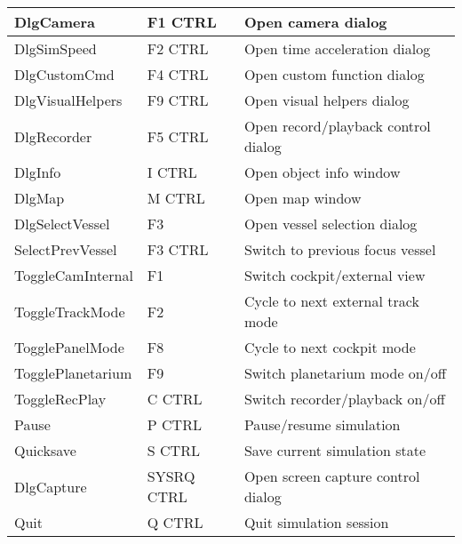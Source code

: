 \documentclass[Orbiter User Manual.tex]{subfiles}
\begin{document}
\begin{longtable}{ |p{}|p{}|p{}| }
	DlgCamera & F1 CTRL & Open camera dialog\\
	\hline\rule{0pt}{2ex}
	DlgSimSpeed & F2 CTRL & Open time acceleration dialog\\
	\hline\rule{0pt}{2ex}
	DlgCustomCmd & F4 CTRL & Open custom function dialog\\
	\hline\rule{0pt}{2ex}
	DlgVisualHelpers & F9 CTRL & Open visual helpers dialog\\
	\hline\rule{0pt}{2ex}
	DlgRecorder & F5 CTRL & Open record/playback control dialog\\
	\hline\rule{0pt}{2ex}
	DlgInfo & I CTRL & Open object info window\\
	\hline\rule{0pt}{2ex}
	DlgMap & M CTRL & Open map window\\
	\hline\rule{0pt}{2ex}
	DlgSelectVessel & F3 & Open vessel selection dialog\\
	\hline\rule{0pt}{2ex}
	SelectPrevVessel & F3 CTRL & Switch to previous focus vessel\\
	\hline\rule{0pt}{2ex}
	ToggleCamInternal & F1 & Switch cockpit/external view\\
	\hline\rule{0pt}{2ex}
	ToggleTrackMode & F2 & Cycle to next external track mode\\
	\hline\rule{0pt}{2ex}
	TogglePanelMode & F8 & Cycle to next cockpit mode\\
	\hline\rule{0pt}{2ex}
	TogglePlanetarium & F9 & Switch planetarium mode on/off\\
	\hline\rule{0pt}{2ex}
	ToggleRecPlay & C CTRL & Switch recorder/playback on/off\\
	\hline\rule{0pt}{2ex}
	Pause & P CTRL & Pause/resume simulation\\
	\hline\rule{0pt}{2ex}
	Quicksave & S CTRL & Save current simulation state\\
	\hline\rule{0pt}{2ex}
	DlgCapture & SYSRQ CTRL & Open screen capture control dialog\\
	\hline\rule{0pt}{2ex}
	Quit & Q CTRL & Quit simulation session\\
	\hline
	\end{longtable}
\end{document}
